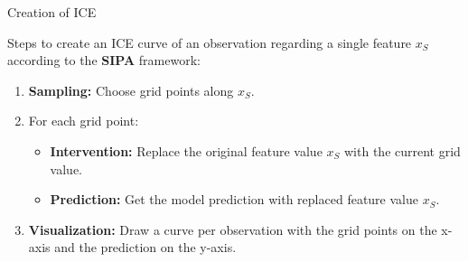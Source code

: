 \documentclass[aspectratio=169]{../latex_main/tntbeamer}  %
\begin{document}
\begin{frame}[c]{Creation of ICE }

Steps to create an ICE curve of an observation regarding a single feature $x_S$ according to the \textbf{SIPA} framework:

\begin{enumerate}
\item \textbf{Sampling:} Choose grid points along $x_S$.
\item For each grid point:
\begin{itemize}
\item \textbf{Intervention:} Replace the original feature value $x_S$ with the current grid value.
\item \textbf{Prediction:} Get the model prediction with replaced feature value $x_S$.
\end{itemize}
\item \textbf{Visualization:} Draw a curve per observation with the grid points on the x-axis and the prediction on the y-axis.
\end{enumerate}

\end{frame}
\end{document}
